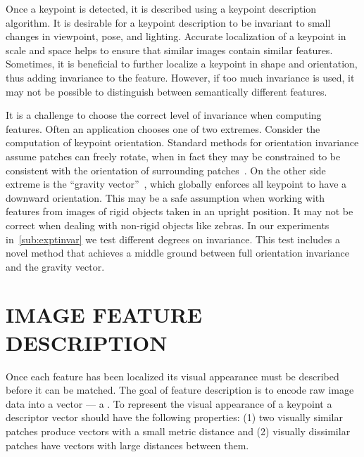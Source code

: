         Once a keypoint is detected, it is described using a keypoint description algorithm. It is desirable for a
        keypoint description to be invariant to small changes in viewpoint, pose, and lighting. Accurate
        localization of a keypoint in scale and space helps to ensure that similar images contain similar features.
        Sometimes, it is beneficial to further localize a keypoint in shape and orientation, thus adding invariance
        to the feature. However, if too much invariance is used, it may not be possible to distinguish between
        semantically different features.

        It is a challenge to choose the correct level of invariance when computing features. Often an application
        chooses one of two extremes. Consider the computation of keypoint orientation. Standard methods for
        orientation invariance assume patches can freely rotate, when in fact they may be constrained to be
        consistent with the orientation of surrounding patches~\cite{lowe_distinctive_2004}. On the other side
        extreme is the ``gravity vector''~\cite{perdoch_efficient_2009}, which globally enforces all keypoint to
        have a downward orientation. This may be a safe assumption when working with features from images of rigid
        objects taken in an upright position. It may not be correct when dealing with non-rigid objects like
        zebras.
        In our experiments in~\cref{sub:exptinvar} we test different degrees on invariance. This test includes a
        novel method that achieves a middle ground between full orientation invariance and the gravity vector.


\section{IMAGE FEATURE DESCRIPTION}\label{sec:featuredescribe}  

    Once each feature has been localized its visual appearance must be described before it can be matched. The goal
    of feature description is to encode raw image data into a vector --- \ie{} a . To
    represent the visual appearance of a keypoint a descriptor vector should have the following properties: (1) two
    visually similar patches produce vectors with a small metric distance and (2) visually dissimilar patches have
    vectors with large distances between them.

